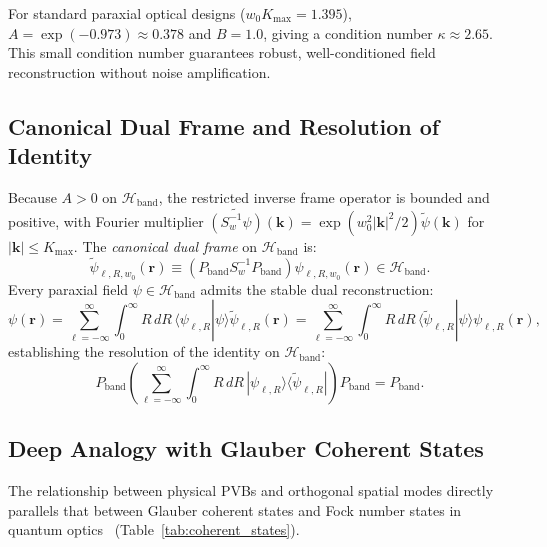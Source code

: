 \documentclass{optica-article}
\begin{document}
For standard paraxial optical designs ($w_0 K_{\max} = 1.395$), $A = \exp(-0.973) \approx 0.378$ and $B = 1.0$, giving a condition number $\kappa \approx 2.65$. This small condition number guarantees robust, well-conditioned field reconstruction without noise amplification.

\subsection{Canonical Dual Frame and Resolution of Identity}

Because $A > 0$ on $\mathcal{H}_{\text{band}}$, the restricted inverse frame operator is bounded and positive, with Fourier multiplier $\widetilde{(S_w^{-1} \psi)}(\mathbf{k}) = \exp(w_0^2 |\mathbf{k}|^2 / 2) \widetilde{\psi}(\mathbf{k})$ for $|\mathbf{k}| \le K_{\max}$. The \emph{canonical dual frame} on $\mathcal{H}_{\text{band}}$ is:
\begin{equation}
\widetilde{\psi}_{\ell, R, w_0}(\mathbf{r}) \equiv (P_{\text{band}} S_w^{-1} P_{\text{band}}) \psi_{\ell, R, w_0}(\mathbf{r}) \in \mathcal{H}_{\text{band}}.
\label{eq:canonical_dual_def}
\end{equation}
Every paraxial field $\psi \in \mathcal{H}_{\text{band}}$ admits the stable dual reconstruction:
\begin{equation}
\boxed{\psi(\mathbf{r}) = \sum_{\ell=-\infty}^\infty \int_0^\infty R \, dR \, \langle \psi_{\ell, R} | \psi \rangle \widetilde{\psi}_{\ell, R}(\mathbf{r}) = \sum_{\ell=-\infty}^\infty \int_0^\infty R \, dR \, \langle \widetilde{\psi}_{\ell, R} | \psi \rangle \psi_{\ell, R}(\mathbf{r}),}
\label{eq:dual_expansion}
\end{equation}
establishing the resolution of the identity on $\mathcal{H}_{\text{band}}$:
\begin{equation}
P_{\text{band}} \left( \sum_{\ell=-\infty}^\infty \int_0^\infty R \, dR \, |\psi_{\ell, R}\rangle \langle \widetilde{\psi}_{\ell, R}| \right) P_{\text{band}} = P_{\text{band}}.
\label{eq:resolution_identity}
\end{equation}

\subsection{Deep Analogy with Glauber Coherent States}

The relationship between physical PVBs and orthogonal spatial modes directly parallels that between Glauber coherent states and Fock number states in quantum optics~\cite{Klauder1985,Perelomov1986} (Table~\ref{tab:coherent_states}).
\end{document}
